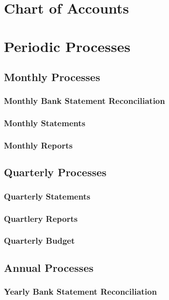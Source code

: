 %
%
%
%
%

\section{Chart of Accounts}

\section{Periodic Processes}

\subsection{Monthly Processes}
\subsubsection{Monthly Bank Statement Reconciliation}
\subsubsection{Monthly Statements}
\subsubsection{Monthly Reports}

\subsection{Quarterly Processes}
\subsubsection{Quarterly Statements}
\subsubsection{Quartlery Reports}
\subsubsection{Quarterly Budget}

\subsection{Annual Processes}
\subsubsection{Yearly Bank Statement Reconciliation}
